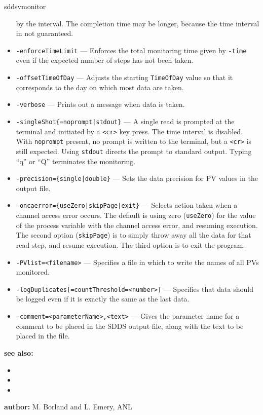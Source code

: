 \begin{sddsprog}{sddsvmonitor}
\begin{itemize}
                by the interval. The completion time may be longer, because the time interval in not guaranteed.
        \item {\tt -enforceTimeLimit} --- Enforces the total monitoring time given by \verb+-time+ even if
                the expected number of steps has not been taken.
        \item {\tt -offsetTimeOfDay} --- Adjusts the starting \verb+TimeOfDay+ value so that it corresponds
                to the day on which most data are taken.
        \item {\tt -verbose} --- Prints out a message when data is taken.
        \item {\verb+-singleShot{=noprompt|stdout}+} --- A single read is prompted at the terminal
                and initiated by a \verb+<cr>+ key press. The time interval is disabled.
                With \verb+noprompt+ present, no prompt is written to the terminal, but a \verb+<cr>+
                is still expected. Using \verb+stdout+ directs the prompt to standard output.
                Typing ``q'' or ``Q'' terminates the monitoring.
        \item {\tt -precision=\{single|double\}} --- Sets the data precision for PV values in the output file.
        \item {\tt -oncaerror=\{useZero|skipPage|exit\}} --- Selects action taken when a channel access error occurs.
                The default is using zero (\verb+useZero+) for the value of the process variable
                with the channel access error, and resuming execution. The second option (\verb+skipPage+) is to
                simply throw away all the data for that read step, and resume execution.
                The third option is to exit the program.
        \item {\tt -PVlist=<filename>} --- Specifies a file in which to write
                the names of all PVs monitored.
        \item {\verb+-logDuplicates[=countThreshold=<number>]+} --- Specifies that data should be
                logged even if it is exactly the same as the last data.
        \item {\verb+-comment=<parameterName>,<text>+} ---
                Gives the parameter name for a comment to be placed in the SDDS output file,
                along with the text to be placed in the file.
    \end{itemize}

\item \textbf{see also:}
    \begin{itemize}
    \item {}
    \item {}
    \item {}
    \end{itemize}
\item \textbf{author:} M. Borland and L. Emery, ANL 
\end{sddsprog}
